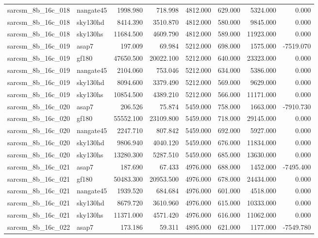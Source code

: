 \begin{tabular}{llrrrrrr}
sarcsm\_8b\_16c\_018 & nangate45 & 1998.980 & 718.998 & 4812.000 & 629.000 & 5324.000 & 0.000 \\
sarcsm\_8b\_16c\_018 & sky130hd & 8414.390 & 3510.870 & 4812.000 & 580.000 & 9845.000 & 0.000 \\
sarcsm\_8b\_16c\_018 & sky130hs & 11684.500 & 4609.790 & 4812.000 & 589.000 & 11923.000 & 0.000 \\
sarcsm\_8b\_16c\_019 & asap7 & 197.009 & 69.984 & 5212.000 & 698.000 & 1575.000 & -7519.070 \\
sarcsm\_8b\_16c\_019 & gf180 & 47650.500 & 20022.100 & 5212.000 & 640.000 & 23323.000 & 0.000 \\
sarcsm\_8b\_16c\_019 & nangate45 & 2104.060 & 753.046 & 5212.000 & 634.000 & 5386.000 & 0.000 \\
sarcsm\_8b\_16c\_019 & sky130hd & 8094.600 & 3379.490 & 5212.000 & 569.000 & 9629.000 & 0.000 \\
sarcsm\_8b\_16c\_019 & sky130hs & 10854.500 & 4389.210 & 5212.000 & 566.000 & 11171.000 & 0.000 \\
sarcsm\_8b\_16c\_020 & asap7 & 206.526 & 75.874 & 5459.000 & 758.000 & 1663.000 & -7910.730 \\
sarcsm\_8b\_16c\_020 & gf180 & 55552.100 & 23109.800 & 5459.000 & 718.000 & 29145.000 & 0.000 \\
sarcsm\_8b\_16c\_020 & nangate45 & 2247.710 & 807.842 & 5459.000 & 692.000 & 5927.000 & 0.000 \\
sarcsm\_8b\_16c\_020 & sky130hd & 9806.940 & 4040.120 & 5459.000 & 676.000 & 11834.000 & 0.000 \\
sarcsm\_8b\_16c\_020 & sky130hs & 13280.300 & 5287.510 & 5459.000 & 685.000 & 13630.000 & 0.000 \\
sarcsm\_8b\_16c\_021 & asap7 & 187.690 & 67.433 & 4976.000 & 688.000 & 1452.000 & -7495.400 \\
sarcsm\_8b\_16c\_021 & gf180 & 50483.300 & 20953.500 & 4976.000 & 678.000 & 24434.000 & 0.000 \\
sarcsm\_8b\_16c\_021 & nangate45 & 1939.520 & 684.684 & 4976.000 & 601.000 & 4518.000 & 0.000 \\
sarcsm\_8b\_16c\_021 & sky130hd & 8679.720 & 3610.960 & 4976.000 & 615.000 & 10333.000 & 0.000 \\
sarcsm\_8b\_16c\_021 & sky130hs & 11371.000 & 4571.420 & 4976.000 & 616.000 & 11062.000 & 0.000 \\
sarcsm\_8b\_16c\_022 & asap7 & 173.186 & 59.311 & 4895.000 & 621.000 & 1177.000 & -7549.780 \\

\end{tabular}
